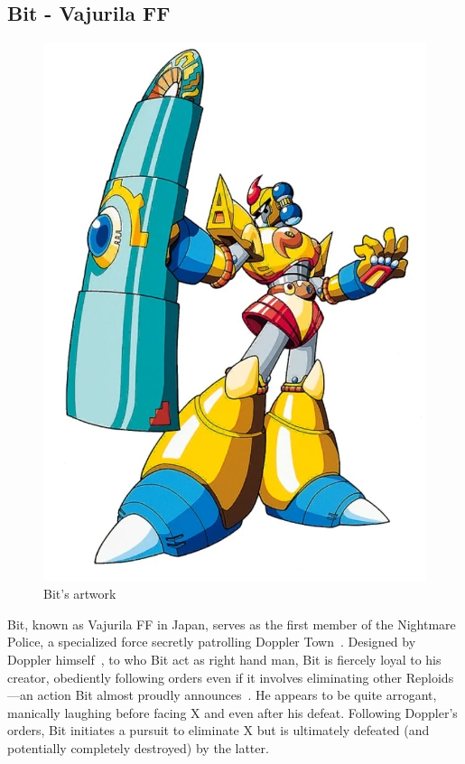 \subsection{Bit - Vajurila FF}\label{boss:Bit}
\begin{figure}[htp]
	\centering
	\includegraphics[height=\portraitsize]{figures/X3/Enemies/bit.png}
	\caption{Bit's artwork~\cite{book:MMX_Complete_art}}
\end{figure}
Bit, known as Vajurila FF in Japan, serves as the first member of the Nightmare Police, a specialized force secretly patrolling Doppler Town~\cite{wayback:X3_resources}. Designed by Doppler himself~\cite{Xcoll1:Manual_X3}, to who Bit act as right hand man, Bit is fiercely loyal to his creator, obediently following orders even if it involves eliminating other Reploids—an action Bit almost proudly announces~\cite{wiki:Bit}. He appears to be quite arrogant, manically laughing before facing X and even after his defeat. Following Doppler's orders, Bit initiates a pursuit to eliminate X but is ultimately defeated (and potentially completely destroyed) by the latter.
